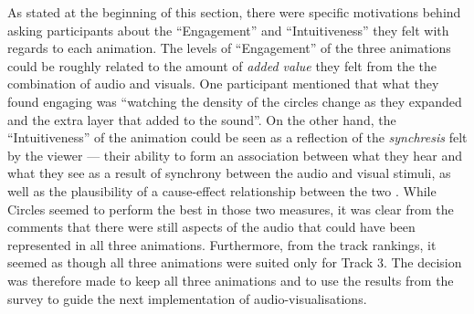 \documentclass[../initial_thesis.tex]{subfiles}
\begin{document}
As stated at the beginning of this section, there were specific motivations behind asking participants about the ``Engagement'' and ``Intuitiveness'' they felt with regards to each animation. The levels of ``Engagement'' of the three animations could be roughly related to the amount of \emph{added value} they felt from the the combination of audio and visuals. One participant mentioned that what they found engaging was ``watching the density of the circles change as they expanded and the extra layer that added to the sound''. On the other hand, the ``Intuitiveness'' of the animation could be seen as a reflection of the \emph{synchresis} felt by the viewer --- their ability to form an association between what they hear and what they see as a result of synchrony between the audio and visual stimuli, as well as the plausibility of a cause-effect relationship between the two \cite{Kubovy2010}. While Circles seemed to perform the best in those two measures, it was clear from the comments that there were still aspects of the audio that could have been represented in all three animations. Furthermore, from the track rankings, it seemed as though all three animations were suited only for Track 3. The decision was therefore made to keep all three animations and to use the results from the survey to guide the next implementation of audio-visualisations.
\end{document}
